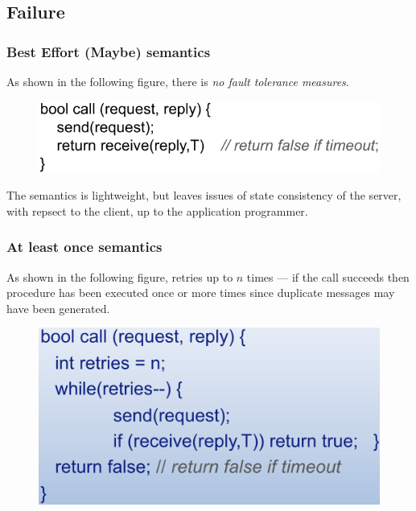 \documentclass[twocolumn,landscape,10pt]{article}
\theoremstyle{definition}
\begin{document}
\subsection{Failure}

\subsubsection{Best Effort (Maybe) semantics}

As shown in the following figure, there is \emph{no fault tolerance measures}.

\begin{figure}[h]
  	\includegraphics[scale=0.35]{maybe_semantics.png}
  	\centering
\end{figure}
\noindent The semantics is lightweight, but leaves issues of state consistency of the
server, with repsect to the client, up to the application programmer.


\subsubsection{At least once semantics}

As shown in the following figure, retries up to $n$ times 
--- if the call succeeds then procedure has been
executed once or more times since duplicate messages may have been generated.

\begin{figure}[h]
  	\includegraphics[scale=0.35]{ato_semantics.png}
  	\centering
\end{figure}
\end{document}
